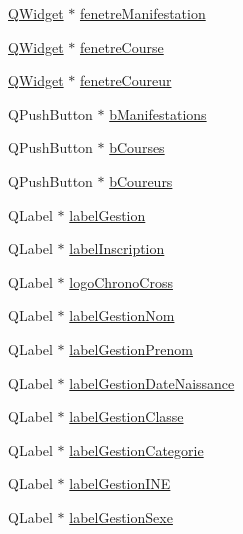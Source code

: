 \begin{DoxyCompactItemize}
\item 
\hyperlink{class_q_widget}{Q\+Widget} $\ast$ \hyperlink{class_i_h_m_gestion_cross_a0e1ed40bb375744135f70cb22d302b02}{fenetre\+Manifestation}
\item 
\hyperlink{class_q_widget}{Q\+Widget} $\ast$ \hyperlink{class_i_h_m_gestion_cross_a939278dde9c1375400bbdd0b3b2476fc}{fenetre\+Course}
\item 
\hyperlink{class_q_widget}{Q\+Widget} $\ast$ \hyperlink{class_i_h_m_gestion_cross_aa776ee3d04b5e02414e4f97ace344c0c}{fenetre\+Coureur}
\item 
Q\+Push\+Button $\ast$ \hyperlink{class_i_h_m_gestion_cross_a540b4525e546b6d61988245ae53768ce}{b\+Manifestations}
\item 
Q\+Push\+Button $\ast$ \hyperlink{class_i_h_m_gestion_cross_a0df377aec07ada51a115cc458854c966}{b\+Courses}
\item 
Q\+Push\+Button $\ast$ \hyperlink{class_i_h_m_gestion_cross_ac2819198bae00b7e0f23e8bc491b4cbb}{b\+Coureurs}
\item 
Q\+Label $\ast$ \hyperlink{class_i_h_m_gestion_cross_abfb2504c2d5189d08e24677e04ddf3ba}{label\+Gestion}
\item 
Q\+Label $\ast$ \hyperlink{class_i_h_m_gestion_cross_a58c321e2d95796d99e70a05260b8aff3}{label\+Inscription}
\item 
Q\+Label $\ast$ \hyperlink{class_i_h_m_gestion_cross_a2025ba71cf1bdbfbec56a8f5552d7a83}{logo\+Chrono\+Cross}
\item 
Q\+Label $\ast$ \hyperlink{class_i_h_m_gestion_cross_a866a6f0ba317b299d4aede5fc276b2bb}{label\+Gestion\+Nom}
\item 
Q\+Label $\ast$ \hyperlink{class_i_h_m_gestion_cross_ae213fa44e6e291f9ca02d8b091ab0d06}{label\+Gestion\+Prenom}
\item 
Q\+Label $\ast$ \hyperlink{class_i_h_m_gestion_cross_af15625b1b1bfb04468f0ed7c6ba39b1b}{label\+Gestion\+Date\+Naissance}
\item 
Q\+Label $\ast$ \hyperlink{class_i_h_m_gestion_cross_a4f070ed70d6d076d07c96562e366c805}{label\+Gestion\+Classe}
\item 
Q\+Label $\ast$ \hyperlink{class_i_h_m_gestion_cross_a04af17f1ebbbbac6d9c4509c94bc6f39}{label\+Gestion\+Categorie}
\item 
Q\+Label $\ast$ \hyperlink{class_i_h_m_gestion_cross_a56e8930b11c38475450df50a48d4581e}{label\+Gestion\+I\+NE}
\item 
Q\+Label $\ast$ \hyperlink{class_i_h_m_gestion_cross_a2e720e692a029a3f4f516a9ad00d2731}{label\+Gestion\+Sexe}

\end{DoxyCompactItemize}
